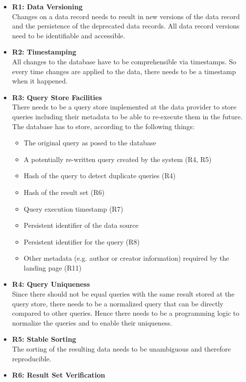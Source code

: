 \documentclass[draft,final]{vutinfth} %
\begin{document}
\begin{itemize}
	\item \textbf{R1: Data Versioning} \\
	Changes on a data record needs to result in new versions of the data record and the persistence of the deprecated data records. All data record versions need to be identifiable and accessible. 
	\item \textbf{R2: Timestamping} \\
	All changes to the database have to be comprehensible via timestamps. So every time changes are applied to the data, there needs to be a timestamp when it happened. 
	\item \textbf{R3: Query Store Facilities} \\
	There needs to be a query store implemented at the data provider to store queries including their metadata to be able to re-execute them in the future. The database has to store, according to \cite{rauber2016identification} the following things: 
	\begin{itemize}
		\item The original query as posed to the database
		\item A potentially re-written query created by the system (R4, R5)
		\item Hash of the query to detect duplicate queries (R4)
		\item Hash of the result set (R6)
		\item Query execution timestamp (R7)
		\item Persistent identifier of the data source
		\item Persistent identifier for the query (R8)
		\item Other metadata (e.g. author or creator information) required by the landing page (R11)
	\end{itemize}
	\item \textbf{R4: Query Uniqueness} \\
	Since there should not be equal queries with the same result stored at the query store, there needs to be a normalized query that can be directly compared to other queries. Hence there needs to be a programming logic to normalize the queries and to enable their uniqueness.
	\item \textbf{R5: Stable Sorting} \\
	The sorting of the resulting data needs to be unambiguous and therefore reproducible.
	\item \textbf{R6: Result Set Verification} \\

\end{itemize}
\end{document}
